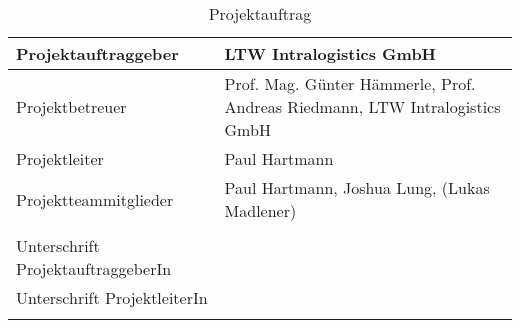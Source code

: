 \begin{longtable}{p{}|p{}}
  Projektauftraggeber   & LTW Intralogistics GmbH                                                                        \\ \midrule

  Projektbetreuer       & Prof. Mag. Günter Hämmerle, Prof. Andreas Riedmann, LTW Intralogistics GmbH                    \\ \midrule

  Projektleiter         & Paul Hartmann                                                                                  \\ \midrule

  Projektteammitglieder & Paul Hartmann, Joshua Lung, (Lukas Madlener)                                                   \\ \midrule

  \\
  Unterschrift ProjektauftraggeberIn                                                                                     \\ \midrule
  Unterschrift ProjektleiterIn                                                                                           \\
  \bottomrule
  \caption{Projektauftrag}
  \label{tab:projektauftrag}
\end{longtable}
